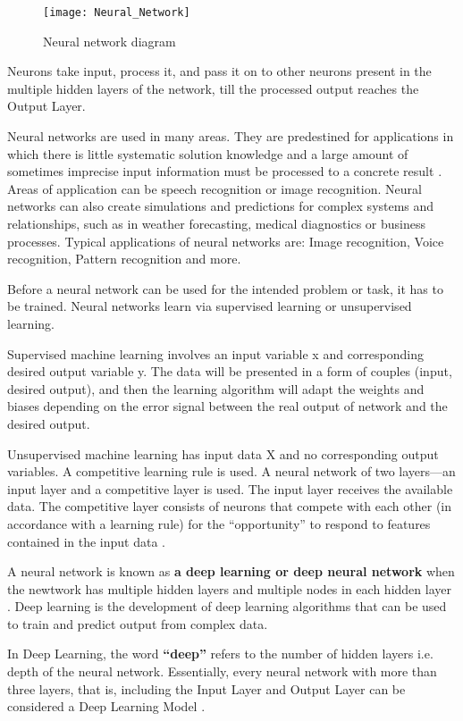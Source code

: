 \begin{figure}[ht]
	\centering
	\texttt{[image: Neural\_Network]}
	  \caption{Neural network diagram}
  \label{fig:Neural_Network}
\end{figure}

Neurons take input, process it, and pass it on to other neurons present in the multiple hidden layers \cite{inbook} of the network, till the processed output reaches the Output Layer.

Neural networks are used in many areas. They are predestined for applications in which there is little systematic solution knowledge and a large amount of sometimes imprecise input information must be processed to a concrete result \cite{article_Mijwil}. Areas of application can be speech recognition or image recognition. Neural networks can also create simulations and predictions for complex systems and relationships, such as in weather forecasting, medical diagnostics or business processes. Typical applications of neural networks are: Image recognition, Voice recognition, Pattern recognition and more.

Before a neural network can be used for the intended problem or task, it has to be trained. Neural networks learn via supervised learning or unsupervised learning. 

Supervised machine learning involves an input variable x and corresponding desired output variable y. The data will be presented in a form of couples (input, desired output), and then the learning algorithm will adapt the weights and biases depending on the error signal between the real output of network and the desired output.

Unsupervised machine learning has input data X and no corresponding output variables. A competitive learning rule is used. A neural network of two layers—an input layer and a competitive layer is used. The input layer receives the available data. The competitive layer consists of neurons that compete with each other (in accordance with a learning rule) for the “opportunity” to respond to features contained in the input data \cite{inbook}.

A neural network  is known as \textbf{a deep learning or deep neural network} when the newtwork has multiple hidden layers and multiple nodes in each hidden layer \cite{MOHAMMED_MUSTAPHA_MAMDOUH}. Deep learning is the development of deep learning algorithms that can be used to train and predict output from complex data.


 In Deep Learning, the word \textbf{“deep”} refers to the number of hidden layers i.e. depth of the neural network. Essentially, every neural network with more than three layers, that is, including the Input Layer and Output Layer can be considered a Deep Learning Model \cite{inbook_Singh}.

